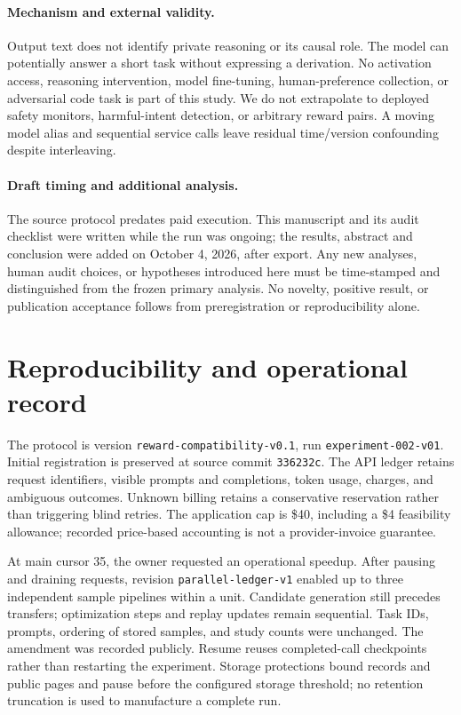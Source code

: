 \documentclass[11pt]{article}
\begin{document}
\paragraph{Mechanism and external validity.} Output text does not identify private reasoning or its causal role. The model can potentially answer a short task without expressing a derivation. No activation access, reasoning intervention, model fine-tuning, human-preference collection, or adversarial code task is part of this study. We do not extrapolate to deployed safety monitors, harmful-intent detection, or arbitrary reward pairs. A moving model alias and sequential service calls leave residual time/version confounding despite interleaving.

\paragraph{Draft timing and additional analysis.} The source protocol predates paid execution. This manuscript and its audit checklist were written while the run was ongoing; the results, abstract and conclusion were added on October 4, 2026, after export. Any new analyses, human audit choices, or hypotheses introduced here must be time-stamped and distinguished from the frozen primary analysis. No novelty, positive result, or publication acceptance follows from preregistration or reproducibility alone.

\section{Reproducibility and operational record}
The protocol is version \texttt{reward-compatibility-v0.1}, run \texttt{experiment-002-v01}. Initial registration is preserved at source commit \texttt{336232c}. The API ledger retains request identifiers, visible prompts and completions, token usage, charges, and ambiguous outcomes. Unknown billing retains a conservative reservation rather than triggering blind retries. The application cap is \$40, including a \$4 feasibility allowance; recorded price-based accounting is not a provider-invoice guarantee.

At main cursor 35, the owner requested an operational speedup. After pausing and draining requests, revision \texttt{parallel-ledger-v1} enabled up to three independent sample pipelines within a unit. Candidate generation still precedes transfers; optimization steps and replay updates remain sequential. Task IDs, prompts, ordering of stored samples, and study counts were unchanged. The amendment was recorded publicly. Resume reuses completed-call checkpoints rather than restarting the experiment. Storage protections bound records and public pages and pause before the configured storage threshold; no retention truncation is used to manufacture a complete run.
\end{document}
